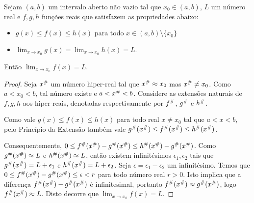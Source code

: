 \documentclass{svmono}
\begin{document}
\begin{theorem}
Sejam $(a,b)$ um intervalo aberto não vazio tal que $x_0 \in (a,b)$, $L$ um
número real e $f,g,h$ funções reais que satisfazem as propriedades
abaixo:
\begin{itemize}
\item $g(x) \le f(x) \le h(x)$ para todo $x \in (a,b) \setminus \{ x_0 \}$
\item $\lim_{x \rightarrow x_0} g(x) = \lim_{x \rightarrow x_0} h(x) = L.$
\end{itemize}
Então $\lim_{x \rightarrow x_0} f(x) = L$.
\end{theorem}

\begin{proof}
Seja ${x}^\#$ um número hiper-real tal que ${x}^\# \approx x_0$ mas
${x}^\# \ne x_0$. Como $a < x_0 < b$, tal número existe e
$a < {x}^\# < b$. Considere as
extensões naturais de $f,g,h$ aos hiper-reais, denotadas respectivamente
por ${f}^\#$, ${g}^\#$ e ${h}^\#$.

Como vale $g(x) \le f(x) \le h(x)$ para todo real $x \ne x_0$ tal que
$a < x < b$, pelo Princípio da Extensão também vale
${g}^\#({x}^\#) \le {f}^\#({x}^\#) \le {h}^\#({x}^\#)$.

Consequentemente, 
$0 \le {f}^\#({x}^\#) - {g}^\#({x}^\#) \le {h}^\#({x}^\#) - {g}^\#({x}^\#)$. Como ${g}^\#({x}^\#) \approx L$ e ${h}^\#({x}^\#) \approx L$, então existem infinitésimos $\epsilon_1, \epsilon_2$ tais que
${g}^\#({x}^\#) = L + \epsilon_1$ e ${h}^\#({x}^\#) = L + \epsilon_2$. Seja $\epsilon = \epsilon_1 - \epsilon_2$ um infinitésimo. Temos que $0 \le {f}^\#({x}^\#) - {g}^\#({x}^\#) \le \epsilon < r$ para todo número real $r > 0$. Isto implica que a diferença ${f}^\#({x}^\#) - {g}^\#({x}^\#)$ é
infinitesimal, portanto ${f}^\#({x}^\#) \approx {g}^\#({x}^\#)$, logo ${f}^\#({x}^\#) \approx L$. Disto decorre que $\lim_{x \rightarrow x_0} f(x) = L$.
\end{proof}

\backmatter


\printindex
\end{document}
